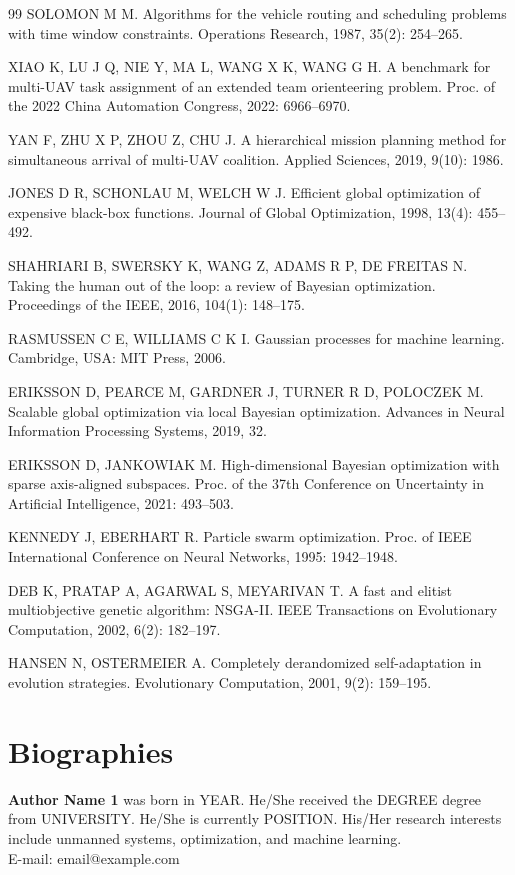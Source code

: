 \documentclass[twocolumn]{article}
\begin{document}
\begin{thebibliography}{99}
SOLOMON M M. Algorithms for the vehicle routing and scheduling problems with time window constraints. Operations Research, 1987, 35(2): 254--265.

XIAO K, LU J Q, NIE Y, MA L, WANG X K, WANG G H. A benchmark for multi-UAV task assignment of an extended team orienteering problem. Proc. of the 2022 China Automation Congress, 2022: 6966--6970.

YAN F, ZHU X P, ZHOU Z, CHU J. A hierarchical mission planning method for simultaneous arrival of multi-UAV coalition. Applied Sciences, 2019, 9(10): 1986.

JONES D R, SCHONLAU M, WELCH W J. Efficient global optimization of expensive black-box functions. Journal of Global Optimization, 1998, 13(4): 455--492.

SHAHRIARI B, SWERSKY K, WANG Z, ADAMS R P, DE FREITAS N. Taking the human out of the loop: a review of Bayesian optimization. Proceedings of the IEEE, 2016, 104(1): 148--175.

RASMUSSEN C E, WILLIAMS C K I. Gaussian processes for machine learning. Cambridge, USA: MIT Press, 2006.

ERIKSSON D, PEARCE M, GARDNER J, TURNER R D, POLOCZEK M. Scalable global optimization via local Bayesian optimization. Advances in Neural Information Processing Systems, 2019, 32.

ERIKSSON D, JANKOWIAK M. High-dimensional Bayesian optimization with sparse axis-aligned subspaces. Proc. of the 37th Conference on Uncertainty in Artificial Intelligence, 2021: 493--503.

KENNEDY J, EBERHART R. Particle swarm optimization. Proc. of IEEE International Conference on Neural Networks, 1995: 1942--1948.

DEB K, PRATAP A, AGARWAL S, MEYARIVAN T. A fast and elitist multiobjective genetic algorithm: NSGA-II. IEEE Transactions on Evolutionary Computation, 2002, 6(2): 182--197.

HANSEN N, OSTERMEIER A. Completely derandomized self-adaptation in evolution strategies. Evolutionary Computation, 2001, 9(2): 159--195.
\end{thebibliography}

\section*{Biographies}
\noindent\textbf{Author Name 1} was born in YEAR. He/She received the DEGREE degree from UNIVERSITY. He/She is currently POSITION. His/Her research interests include unmanned systems, optimization, and machine learning.\\
E-mail: email@example.com
\end{document}
